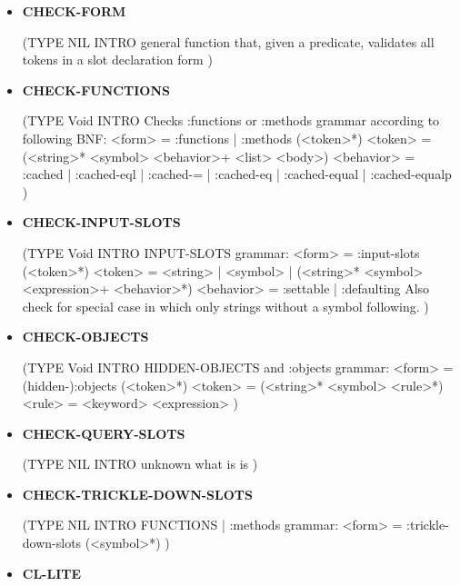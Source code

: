 \documentclass [11pt]{book}
\begin{document}
\begin{itemize}
\item {}
\label{prim:check-form}
\textbf{CHECK-FORM}

(TYPE NIL INTRO general function that, given a predicate, validates all tokens in a slot declaration form
)



\item {}
\label{prim:check-functions}
\textbf{CHECK-FUNCTIONS}

(TYPE Void INTRO  Checks :functions or :methods grammar according to following BNF:
<form>  = :functions | :methods (<token>*)
<token> = (<string>* <symbol> <behavior>+ <list> <body>)
<behavior> = :cached | :cached-eql | :cached-= | :cached-eq | :cached-equal | :cached-equalp
)



\item {}
\label{prim:check-input-slots}
\textbf{CHECK-INPUT-SLOTS}

(TYPE Void INTRO  INPUT-SLOTS grammar: 
<form>     = :input-slots (<token>*)
<token>    = <string> | <symbol> | (<string>* <symbol> <expression>+ <behavior>*)
<behavior> = :settable | :defaulting
Also check for special case in which only strings without a symbol following.
)



\item {}
\label{prim:check-objects}
\textbf{CHECK-OBJECTS}

(TYPE Void INTRO  HIDDEN-OBJECTS and :objects grammar: 
<form>  = (hidden-):objects (<token>*)
<token> = (<string>* <symbol> <rule>*)
<rule>  = <keyword> <expression>
)



\item {}
\label{prim:check-query-slots}
\textbf{CHECK-QUERY-SLOTS}

(TYPE NIL INTRO unknown what is is
)



\item {}
\label{prim:check-trickle-down-slots}
\textbf{CHECK-TRICKLE-DOWN-SLOTS}

(TYPE NIL INTRO  FUNCTIONS | :methods grammar: 
<form>  = :trickle-down-slots (<symbol>*)
)



\item {}
\label{prim:cl-lite}
\textbf{CL-LITE}


\end{itemize}
\end{document}
